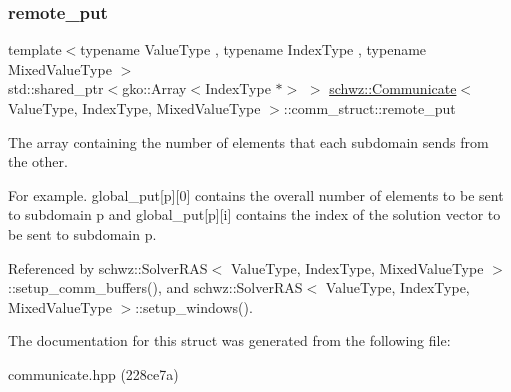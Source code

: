 \subsubsection{\texorpdfstring{remote\+\_\+put}{remote\_put}}
{\footnotesize\ttfamily template$<$typename Value\+Type , typename Index\+Type , typename Mixed\+Value\+Type $>$ \\
std\+::shared\+\_\+ptr$<$gko\+::\+Array$<$Index\+Type $\ast$$>$ $>$ \hyperlink{classschwz_1_1Communicate}{schwz\+::\+Communicate}$<$ Value\+Type, Index\+Type, Mixed\+Value\+Type $>$\+::comm\+\_\+struct\+::remote\+\_\+put}



The array containing the number of elements that each subdomain sends from the other. 

For example. global\+\_\+put\mbox{[}p\mbox{]}\mbox{[}0\mbox{]} contains the overall number of elements to be sent to subdomain p and global\+\_\+put\mbox{[}p\mbox{]}\mbox{[}i\mbox{]} contains the index of the solution vector to be sent to subdomain p. 

Referenced by schwz\+::\+Solver\+R\+A\+S$<$ Value\+Type, Index\+Type, Mixed\+Value\+Type $>$\+::setup\+\_\+comm\+\_\+buffers(), and schwz\+::\+Solver\+R\+A\+S$<$ Value\+Type, Index\+Type, Mixed\+Value\+Type $>$\+::setup\+\_\+windows().



The documentation for this struct was generated from the following file\+:\begin{DoxyCompactItemize}
\item 
communicate.\+hpp (228ce7a)\end{DoxyCompactItemize}
